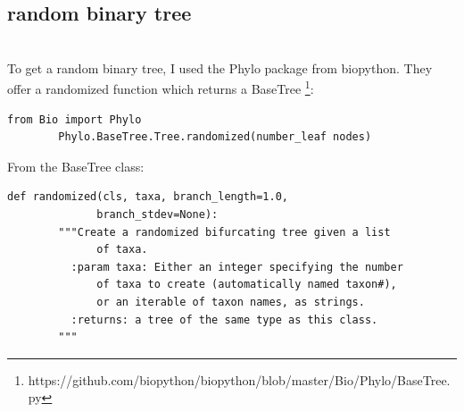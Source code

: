     \subsection{random binary tree}
       \\
      To get a random binary tree, I used the Phylo package from biopython. They offer a randomized
        function which returns a BaseTree \footnote{
          https://github.com/biopython/biopython/blob/master/Bio/Phylo/BaseTree.py
        }:
      \begin{lstlisting}[gobble=6]
        from Bio import Phylo
        Phylo.BaseTree.Tree.randomized(number_leaf nodes)
      \end{lstlisting}
      From the BaseTree class:
      \begin{lstlisting}[gobble=6]
        def randomized(cls, taxa, branch_length=1.0, 
              branch_stdev=None):
        """Create a randomized bifurcating tree given a list
              of taxa.
          :param taxa: Either an integer specifying the number
              of taxa to create (automatically named taxon#), 
              or an iterable of taxon names, as strings.
          :returns: a tree of the same type as this class.
        """
      \end{lstlisting}

